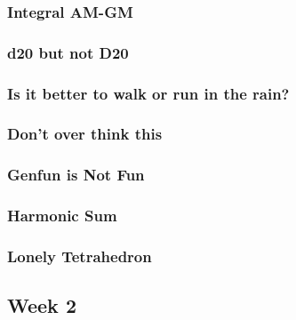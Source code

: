 \documentclass[titlepage=true]{scrartcl}
\begin{document}
        \subsubsection{Integral AM-GM}
        \label{11-1-1}
        
        \newpage

        \subsubsection{d20 but not D20}
        \label{11-1-2}
        
        \newpage

        \subsubsection{Is it better to walk or run in the rain?}
        \label{11-1-3}
        
        \newpage

        \subsubsection{Don't over think this}
        \label{11-1-4}
        
        \newpage
        
        \subsubsection{Genfun is Not Fun}
        \label{11-1-5}
        
        \newpage

        \subsubsection{Harmonic Sum}
        \label{11-1-6}
        
        \newpage

        \subsubsection{Lonely Tetrahedron}
        \label{11-1-7}
        
        \newpage

    \subsection{Week 2}
\end{document}
